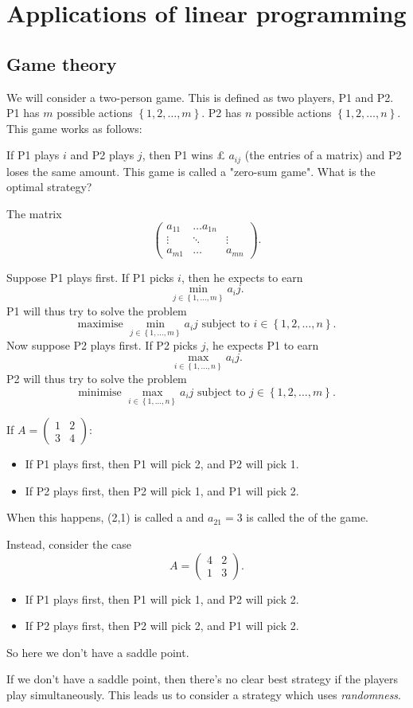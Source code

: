 \documentclass[a4paper]{scrartcl}
\begin{document}
\section{Applications of linear programming}
\subsection{Game theory}
We will consider a two-person game. This is defined as two players, P1 and P2. P1 has $m$ possible actions $\left\{1,2,\ldots ,m\right\}$. P2 has $n$ possible actions $\left\{1,2,\ldots ,n\right\}$. This game works as follows:

If P1 plays $i$ and P2 plays $j$, then P1 wins £ $a_{ij}$ (the entries of a matrix) and P2 loses the same amount. This game is called a "zero-sum game". What is the optimal strategy?
\begin{definition}
	 The matrix 
	 \[\begin{pmatrix} a_{11} &\ldots a_{1n}&\\\vdots&\ddots&\vdots\\a_{m1}&\ldots &a_{mn}\end{pmatrix}.\]
\end{definition}
Suppose P1 plays first. If P1 picks $i$, then he expects to earn 
\[\min_{j \in \left\{1,\ldots ,m\right\}}a_ij.\]
P1 will thus try to solve the problem
\[\text{maximise } \min_{j \in \left\{1,\ldots ,m\right\}}a_ij \text{ subject to } i \in \left\{1,2,\ldots ,n\right\}.\]
Now suppose P2 plays first. If P2 picks $j$, he expects P1 to earn
\[\max_{i \in \left\{1,\ldots ,n\right\}}a_ij.\] 
P2 will thus try to solve the problem
\[\text{minimise } \max_{i \in \left\{1,\ldots ,n\right\}}a_ij \text{ subject to } j \in \left\{1,2,\ldots ,m\right\}.\]
\begin{example}
	 If $A=\begin{pmatrix} 1&2\\3&4 \end{pmatrix}$:
	 \begin{itemize}
		 \item If P1 plays first, then P1 will pick 2, and P2 will pick 1.
		 \item If P2 plays first, then P2 will pick 1, and P1 will pick 2.
	 \end{itemize}
	 When this happens, (2,1) is called a  and $a_{21}=3$ is called the  of the game.

	 Instead, consider the case 
	 \[A=\begin{pmatrix} 4&2\\1&3 \end{pmatrix}.\]
	 \begin{itemize}
		\item If P1 plays first, then P1 will pick 1, and P2 will pick 2.
		\item If P2 plays first, then P2 will pick 2, and P1 will pick 2.
	\end{itemize}
	 So here we don't have a saddle point.
\end{example}
If we don't have a saddle point, then there's no clear best strategy if the players play simultaneously. This leads us to consider a strategy which uses \emph{randomness}.
\end{document}
